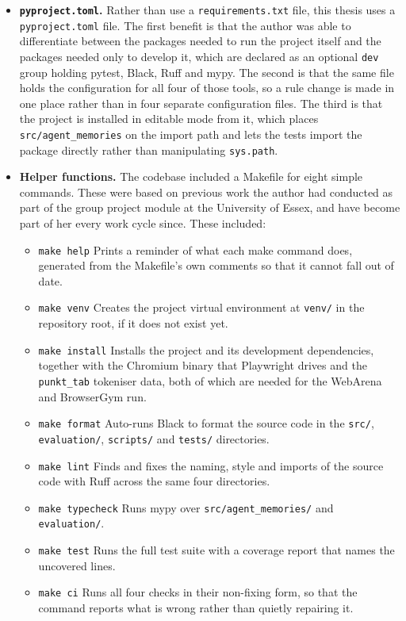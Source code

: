 \begin{itemize}
    \item \textbf{\texttt{pyproject.toml}.} Rather than use a
    \texttt{requirements.txt} file, this thesis uses a \texttt{pyproject.toml}
    file. The first benefit is that the author was able to differentiate between
    the packages needed to run the project itself and the packages needed only
    to develop it, which are declared as an optional \texttt{dev} group holding
    pytest, Black, Ruff and mypy. The second is that the same file holds the
    configuration for all four of those tools, so a rule change is made in one
    place rather than in four separate configuration files. The third is that
    the project is installed in editable mode from it, which places
    \texttt{src/agent\_memories} on the import path and lets the tests import
    the package directly rather than manipulating \texttt{sys.path}.

    \item \textbf{Helper functions.} The codebase included a Makefile for eight
    simple commands. These were based on previous work the author had conducted
    as part of the group project module at the University of Essex, and have
    become part of her every work cycle since. These included:
    \begin{itemize}
        \item \texttt{make help} Prints a reminder of what each make command
        does, generated from the Makefile's own comments so that it cannot fall
        out of date.
        \item \texttt{make venv} Creates the project virtual environment at
        \texttt{venv/} in the repository root, if it does not exist yet.
        \item \texttt{make install} Installs the project and its development
        dependencies, together with the Chromium binary that Playwright drives
        and the \texttt{punkt\_tab} tokeniser data, both of which are needed for
        the WebArena and BrowserGym run.
        \item \texttt{make format} Auto-runs Black to format the source code in
        the \texttt{src/}, \texttt{evaluation/}, \texttt{scripts/} and
        \texttt{tests/} directories.
        \item \texttt{make lint} Finds and fixes the naming, style and imports
        of the source code with Ruff across the same four directories.
        \item \texttt{make typecheck} Runs mypy over
        \texttt{src/agent\_memories/} and \texttt{evaluation/}.
        \item \texttt{make test} Runs the full test suite with a coverage
        report that names the uncovered lines.
        \item \texttt{make ci} Runs all four checks in their non-fixing form,
        so that the command reports what is wrong rather than quietly repairing
        it.
    \end{itemize}


\end{itemize}
